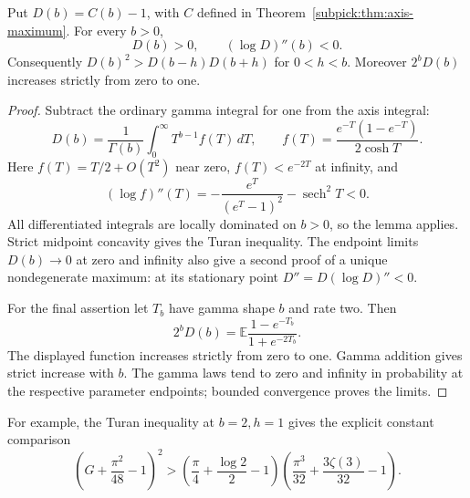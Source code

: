 \begin{theorem}\label{envref:thm:shape}
Put $D(b)=C(b)-1$, with $C$ defined in
Theorem~\ref{subpick:thm:axis-maximum}. For every $b>0$,
\[
 D(b)>0,\qquad (\log D)''(b)<0.
\]
Consequently $D(b)^2>D(b-h)D(b+h)$ for $0<h<b$.
Moreover $2^bD(b)$ increases strictly from zero to one.
\end{theorem}
\begin{proof}
Subtract the ordinary gamma integral for one from the axis integral:
\[
 D(b)=\frac1{\Gamma(b)}\int_0^\infty T^{b-1}f(T)\,dT,
 \qquad f(T)=\frac{e^{-T}(1-e^{-T})}{2\cosh T}.
\]
Here $f(T)=T/2+O(T^2)$ near zero, $f(T)<e^{-2T}$ at infinity, and
\[
 (\log f)''(T)=-\frac{e^T}{(e^T-1)^2}-\operatorname{sech}^2T<0.
\]
All differentiated integrals are locally dominated on $b>0$, so the
lemma applies. Strict midpoint concavity gives the Turan inequality.
The endpoint limits $D(b)\to0$ at zero and infinity also give a second
proof of a unique nondegenerate maximum: at its stationary point
$D''=D(\log D)''<0$.

For the final assertion let $T_b$ have gamma shape $b$ and rate two.
Then
\[
 2^bD(b)=\mathbb E\frac{1-e^{-T_b}}{1+e^{-2T_b}}.
\]
The displayed function increases strictly from zero to one. Gamma
addition gives strict increase with $b$. The gamma laws tend to zero
and infinity in probability at the respective parameter endpoints;
bounded convergence proves the limits.
\end{proof}

For example, the Turan inequality at $b=2,h=1$ gives the explicit
constant comparison
\[
 \left(G+\frac{\pi^2}{48}-1\right)^2>
 \left(\frac\pi4+\frac{\log2}{2}-1\right)
 \left(\frac{\pi^3}{32}+\frac{3\zeta(3)}{32}-1\right).
\]

